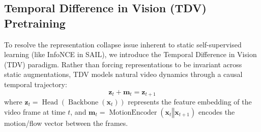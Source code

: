 \documentclass[12pt,a4paper]{article}
\begin{document}
\subsection{Temporal Difference in Vision (TDV) Pretraining}
\label{sec:tdv_methods}

To resolve the representation collapse issue inherent to static self-supervised learning (like InfoNCE in SAIL), we introduce the Temporal Difference in Vision (TDV) paradigm. Rather than forcing representations to be invariant across static augmentations, TDV models natural video dynamics through a causal temporal trajectory:
\begin{equation}
  \mathbf{z}_t + \mathbf{m}_t = \mathbf{z}_{t+1}
  \label{eq:tdv_causal}
\end{equation}
where $\mathbf{z}_t = \operatorname{Head}(\operatorname{Backbone}(\mathbf{x}_t))$ represents the feature embedding of the video frame at time $t$, and $\mathbf{m}_t = \operatorname{MotionEncoder}(\mathbf{x}_t \mathbin{\Vert} \mathbf{x}_{t+1})$ encodes the motion/flow vector between the frames.
\end{document}

